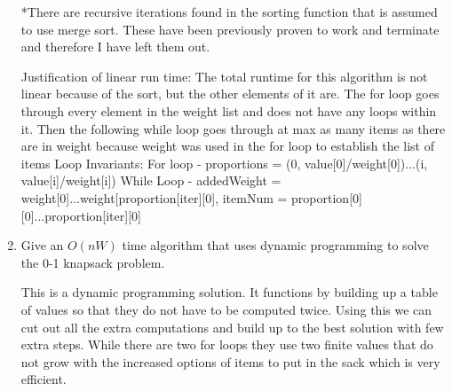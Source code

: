 \documentclass{article}
\begin{document}
\begin{enumerate}
 *There are recursive iterations found in the sorting function that is assumed to use merge sort. These have been previously proven to work and terminate and therefore I have left them out.

    Justification of linear run time: The total runtime for this algorithm is not linear because of the sort, but the other elements of it are. The for loop goes through every element in the weight list and does not have any loops within it. Then the following while loop goes through at max as many items as there are in weight because weight was used in the for loop to establish the list of items\newline\newline
    Loop Invariants:\newline 
    For loop - proportions = (0, value[0]/weight[0])...(i, value[i]/weight[i])\newline
    While Loop - addedWeight = weight[0]...weight[proportion[iter][0], itemNum = proportion[0][0]...proportion[iter][0]\newline

    \item Give an $O(nW)$ time algorithm that uses dynamic programming to solve
        the 0-1 knapsack problem.\newline\newline
        
        This is a dynamic programming solution. It functions by building up a table of values so that they do not have to be computed twice. Using this we can cut out all the extra computations and build up to the best solution with few extra steps. While there are two for loops they use two finite values that do not grow with the increased options of items to put in the sack which is very efficient.
        

\end{enumerate}
\end{document}
